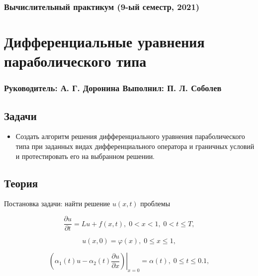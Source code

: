 




\subsubsection*{Вычислительный практикум (9-ый семестр, 2021)}
\section*{Дифференциальные уравнения параболического типа}
\subsubsection*{Руководитель: А. Г. Доронина \hspace{2em} Выполнил: П. Л. Соболев}

\vspace{3em}

\subsection*{Задачи}

\begin{itemize}
  \setlength\itemsep{-0.1em}
  \item Создать алгоритм решения дифференциального уравнения параболического типа при заданных видах дифференциального оператора и граничных условий и протестировать его на выбранном решении.
\end{itemize}

\subsection*{Теория}

Постановка задачи: найти решение $ u(x, t) $ проблемы

\su
\begin{equation}
  \frac{\partial u}{\partial t} = L u + f(x, t), \; 0 < x < 1, \; 0 < t \leqslant T,
\end{equation}

\su\su
\begin{equation}
  u(x, 0) = \varphi(x), \; 0 \leqslant x \leqslant 1,
\end{equation}

\su\su
\begin{equation}
  \left. \left( \alpha_1(t) u - \alpha_2(t) \frac{\partial u}{\partial x} \right) \right|_{x=0} = \alpha(t), \; 0 \leqslant t \leqslant 0.1,
\end{equation}

